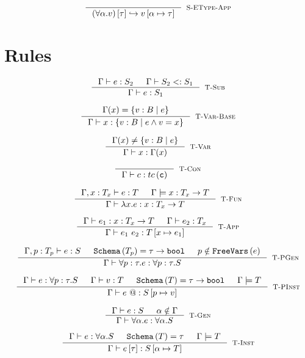 \documentclass[10pt,a4paper]{article}
\makeatletter
\newcommand\vref{\ensuremath{v}}
\newcommand\tref[2]{\ensuremath{\left\lbrace \vref : #1\mid #2\right\rbrace}}
\newcommand\tbbool{\ensuremath{\texttt{bool}}}
\newcommand\tc[1]{\ensuremath{tc\left(\texttt{#1}\right)}}
\newcommand\tfun[3]{\ensuremath{#1 : #2 \rightarrow #3}}
\newcommand\tpabs[3]{\ensuremath{\forall #1 : #2 . #3}}
\newcommand\ttabs[2]{\ensuremath{\forall #1 . #2}}
\newcommand\etabs[2]{\ensuremath{\forall #1 . #2}}
\newcommand\epabs[3]{\ensuremath{\forall #1 : #2 . #3}}
\newcommand\efun[2]{\ensuremath{\lambda #1 . #2}}
\newcommand\eapp[2]{\ensuremath{{#1} \ {#2}}}
\newcommand\etapp[2]{\ensuremath{{#1} \left[ {#2}\right]}}
\newcommand\epapp[1]{\ensuremath{{#1} \ @}}
\newcommand\tapp{\rulename{T-App}}
\newcommand\tsub{\rulename{T-Sub}}
\newcommand\tcon{\rulename{T-Con}}
\newcommand\tinst{\rulename{T-Inst}}
\newcommand\tgen{\rulename{T-Gen}}
\newcommand\tpinst{\rulename{T-PInst}}
\newcommand\tpgen{\rulename{T-PGen}}
\newcommand\isWellFormed[2]{\ensuremath{{#1}\models {#2}}}
\newcommand\isSub[3]{\ensuremath{{#1}\vdash {#2}<:{#3}}}
\newcommand\hastype[3]{\ensuremath{{#1}\vdash {#2}:{#3}}}
\newcommand\eval[2]{\ensuremath{{#1}\hookrightarrow {#2}}}
\newcommand\rulename[1]{\textsc{#1}}
\newcommand\sch[1]{\ensuremath{\texttt{Schema}\left(#1\right)}}
\newcommand\fv[1]{\ensuremath{\texttt{FreeVars}\left(#1\right)}}
\newcommand\sub[2]{\ensuremath{\left[ #1 \mapsto #2 \right]}}
\makeatother
\begin{document}
$$
\inference{
}{
	\eval{\etapp{(\etabs{\alpha}{v})}{\tau}}{v\sub{\alpha}{\tau}}
}[\rulename{S-EType-App}]
$$


\section*{Rules}
\hfill\fbox{\hastype{\Gamma}{e}{S}}

$$
\inference{
	\hastype{\Gamma}{e}{S_2} && \isSub{\Gamma}{S_2}{S_1}
}{
	\hastype{\Gamma}{e}{S_1}
}[\tsub]
$$

$$
\inference{
	\Gamma(x) = \tref{B}{e}
}{
	\hastype{\Gamma}{x}{\tref{B}{e \land \vref = x}}
}[\rulename{T-Var-Base}]
$$

$$
\inference{
	\Gamma(x) \neq \tref{B}{e}
}{
	\hastype{\Gamma}{x}{\Gamma(x)}
}[\rulename{T-Var}]
$$

$$
\inference{
}{
	\hastype{\Gamma}{c}{\tc{c}}
}[\tcon]
$$

$$
\inference{
	\hastype{\Gamma, x : T_x}{e}{T} && \isWellFormed{\Gamma}{\tfun{x}{T_x}{T}}
}{
	\hastype{\Gamma}{\efun{x}{e}}{\tfun{x}{T_x}{T}}
}[\rulename{T-Fun}]
$$

$$\label{tapp}
\inference{
	\hastype{\Gamma}{e_1}{\tfun{x}{T_x}{T}} && 
	\hastype{\Gamma}{e_2}{T_x}
}{
	\hastype{\Gamma}{\eapp{e_1}{e_2}}{T\sub{x}{e_1}}
}[\tapp]
$$

$$
\inference{
	\hastype{\Gamma, p:T_p}{e}{S} && 
	\sch{T_p} = \tau \rightarrow \tbbool &&
	p \notin \fv{e}
}{
	\hastype{\Gamma}{\epabs{p}{\tau}{e}}{\tpabs{p}{\tau}{S}}
}[\tpgen]
$$

$$
\inference{
	\hastype{\Gamma}{e}{\tpabs{p}{\tau}{S}} && 
	\hastype{\Gamma}{v}{T} && \sch{T} = \tau \rightarrow \tbbool &&
	\isWellFormed{\Gamma}{T}
}{
	\hastype{\Gamma}{\epapp{e}}{S\sub{p}{v}}
}[\tpinst]
$$

$$
\inference{
	\hastype{\Gamma}{e}{S} && 
	\alpha \notin \Gamma
}{
	\hastype{\Gamma}{\etabs{\alpha}{e}}{\ttabs{\alpha}{S}}
}[\tgen]
$$

$$
\inference{
	\hastype{\Gamma}{e}{\ttabs{\alpha}{S}} && 
	\sch{T} = \tau && \isWellFormed{\Gamma}{T}
}{
	\hastype{\Gamma}{\etapp{e}{\tau}}{S\sub{\alpha}{T}}
}[\tinst]
$$

\hfill\fbox{\isWellFormed{\Gamma}{\rho}}
\end{document}
